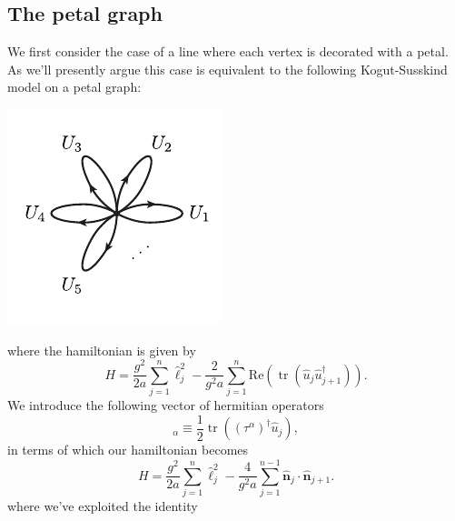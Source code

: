 \documentclass[12pt]{amsart}
\newcommand{\tr}{\operatorname{tr}}
\theoremstyle{definition}
\theoremstyle{remark}
\numberwithin{equation}{section}
\begin{document}
\subsection{The petal graph}
We first consider the case of a line where each vertex is decorated with a petal. As we'll presently argue this case is equivalent to the following Kogut-Susskind model on a petal graph:
\begin{center}
	\includegraphics{petal2.pdf}
\end{center}
where the hamiltonian is given by
\begin{equation}
	H = \frac{g^2}{2 a} \sum_{j=1}^n \widehat{\ell}^2_j - \frac{2}{g^2 a} \sum_{j=1}^n \text{Re}(\tr(\widehat{u}_j\widehat{u}_{j+1}^\dag)).
\end{equation}
We introduce the following vector of hermitian operators
\begin{equation}
	[\widehat{\mathbf{n}}_j]_\alpha \equiv \frac12\tr((\tau^\alpha)^\dag \widehat{u}_j),
\end{equation}
in terms of which our hamiltonian becomes 
\begin{equation}
	H = \frac{g^2}{2 a} \sum_{j=1}^n \widehat{\ell}^2_j - \frac{4}{g^2 a} \sum_{j=1}^{n-1} \widehat{\mathbf{n}}_j\cdot \widehat{\mathbf{n}}_{j+1}.
\end{equation}
where we've exploited the identity
\end{document}

